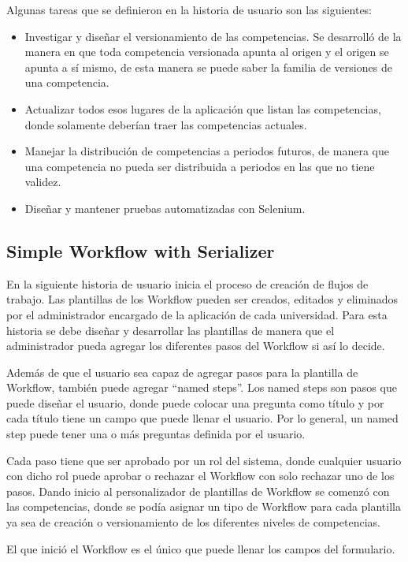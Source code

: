 Algunas tareas que se definieron en la historia de usuario son las siguientes:
\begin{itemize}
	\item Investigar y diseñar el versionamiento de las competencias. Se desarrolló de la manera en que toda competencia versionada apunta al origen y el origen se apunta a sí mismo, de esta manera se puede saber la familia de versiones de una competencia.
	\item Actualizar todos esos lugares de la aplicación que listan las competencias, donde solamente deberían traer las competencias actuales.
	\item Manejar la distribución de competencias a periodos futuros, de manera que una competencia no pueda ser distribuida a periodos en las que no tiene validez.
	\item Diseñar y mantener pruebas automatizadas con Selenium.
\end{itemize}

\subsection{Simple Workflow with Serializer}
En la siguiente historia de usuario inicia el proceso de creación de flujos de trabajo. Las plantillas de los Workflow pueden ser creados, editados y eliminados por el administrador encargado de la aplicación de cada universidad. Para esta historia se debe diseñar y desarrollar las plantillas de manera que el administrador pueda agregar los diferentes pasos del Workflow si así lo decide.

Además de que el usuario sea capaz de agregar pasos para la plantilla de Workflow, también puede agregar “named steps”. Los named steps son pasos que puede diseñar el usuario, donde puede colocar una pregunta como título y por cada título tiene un campo que puede llenar el usuario. Por lo general, un named step puede tener una o más preguntas definida por el usuario.

Cada paso tiene que ser aprobado por un rol del sistema, donde cualquier usuario con dicho rol puede aprobar o rechazar el Workflow con solo rechazar uno de los pasos. Dando inicio al personalizador de plantillas de Workflow se comenzó con las competencias, donde se podía asignar un tipo de Workflow para cada plantilla ya sea de creación o versionamiento de los diferentes niveles de competencias.

El que inició el Workflow es el único que puede llenar los campos del formulario.

